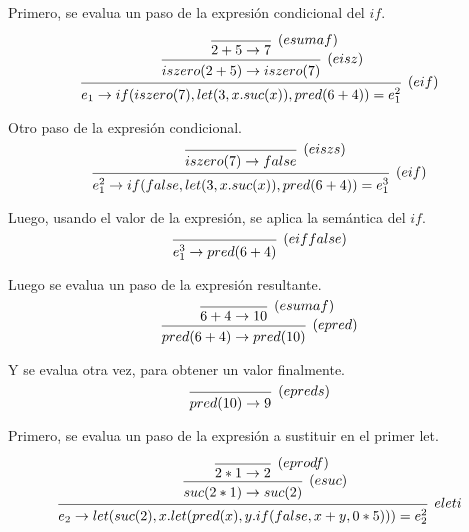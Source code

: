 \documentclass{article}
\begin{document}
\begin{enumerate}
{\begin{enumerate}
{				Primero, se evalua un paso de la expresión condicional del $if$.

				\[
					\begin{prooftree}
						\infer 0 [$(esumaf)$] {2 + 5 \rightarrow 7}

						\infer 1 [$(eisz)$] {iszero(2+5) \rightarrow iszero(7)}

						\infer 1 [$(eif)$] 
							{	
								e_1
								\rightarrow
								if(iszero(7), let(3, x.suc(x)), pred(6+4)) = e_1^2
							}
					\end{prooftree}
				\]

				Otro paso de la expresión condicional.
				\[
					\begin{prooftree}
						\infer 0 [$(eiszs)$] {iszero(7) \rightarrow false}

						\infer 1 [$(eif)$] 
							{	
								e_1^2
								\rightarrow
								if(false, let(3, x.suc(x)), pred(6+4)) = e_1^3
							}
					\end{prooftree}
				\]
				

				Luego, usando el valor de la expresión, se aplica la semántica
				del $if$.
				\[
					\begin{prooftree}
						\infer 0 [$(eiffalse)$] 
						{	
							e_1^3
							\rightarrow
							pred(6+4)
						}
					\end{prooftree}
				\]

				Luego se evalua un paso de la expresión resultante.
				\[
					\begin{prooftree}
						\infer 0 [$(esumaf)$] {6 + 4 \rightarrow 10}

						\infer 1 [$(epred)$] {pred(6 + 4) \rightarrow pred(10)}
					\end{prooftree}
				\]

				Y se evalua otra vez, para obtener un valor finalmente.
				\[
					\begin{prooftree}

						\infer 0 [$(epreds)$] {pred(10) \rightarrow 9}
					\end{prooftree}
				\]

				Primero, se evalua un paso de la expresión a sustituir en el 
				primer let.

				\[
					\begin{prooftree}
						\infer 0 [$(eprodf)$] {2*1 \rightarrow 2}

						\infer 1 [$(esuc)$] {suc(2*1) \rightarrow suc(2)}

						\infer 1 [$eleti$] {
							e_2
							\rightarrow
							let(suc(2), x.let(pred(x), y.if(false, x+y, 0*5))) = e_2^2
						}
					\end{prooftree}	
				\]

}
\end{enumerate}}
\end{enumerate}
\end{document}
